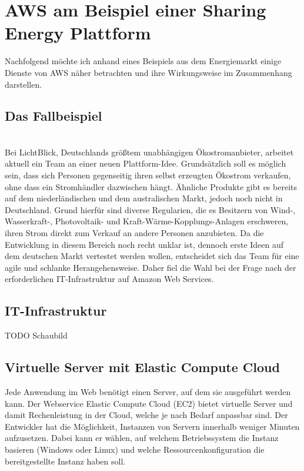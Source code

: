\chapter{AWS am Beispiel einer Sharing Energy Plattform}\label{chapter:kapitellabel} %
Nachfolgend möchte ich anhand eines Beispiels aus dem Energiemarkt einige Dienste von AWS näher betrachten und ihre Wirkungsweise im Zusammenhang darstellen.

\section{Das Fallbeispiel}
\label{sec:fallbeispiel}
\\ Bei LichtBlick, Deutschlands größtem unabhängigen Ökostromanbieter, arbeitet aktuell ein Team an einer neuen Plattform-Idee. Grundsätzlich soll es möglich sein, dass sich Personen gegenseitig ihren selbst erzeugten Ökostrom verkaufen, ohne dass ein Stromhändler dazwischen hängt. Ähnliche Produkte gibt es bereits auf dem niederländischen und dem australischen Markt, jedoch noch nicht in Deutschland. Grund hierfür sind diverse Regularien, die es Besitzern von Wind-, Wasserkraft-, Photovoltaik- und Kraft-Wärme-Kopplungs-Anlagen erschweren, ihren Strom direkt zum Verkauf an andere Personen anzubieten. Da die Entwicklung in diesem Bereich noch recht unklar ist, dennoch erste Ideen auf dem deutschen Markt vertestet werden wollen, entscheidet sich das Team für eine agile und schlanke Herangehensweise. Daher fiel die Wahl bei der Frage nach der erforderlichen IT-Infrastruktur auf Amazon Web Services.


\section{IT-Infrastruktur}
\label{sec:infrastruktur}

TODO Schaubild

\section{Virtuelle Server mit Elastic Compute Cloud}
Jede Anwendung im Web benötigt einen Server, auf dem sie ausgeführt werden kann. Der Webservice Elastic Compute Cloud (EC2) bietet virtuelle Server und damit Rechenleistung in der Cloud, welche je nach Bedarf anpassbar sind. \cite{aws:ec2}
Der Entwickler hat die Möglichkeit, Instanzen von Servern innerhalb weniger Minuten aufzusetzen. Dabei kann er wählen, auf welchem Betriebssystem die Instanz basieren (Windows oder Linux) und welche Ressourcenkonfiguration die bereitgestellte Instanz haben soll. \cite{aws:ec2} \\

